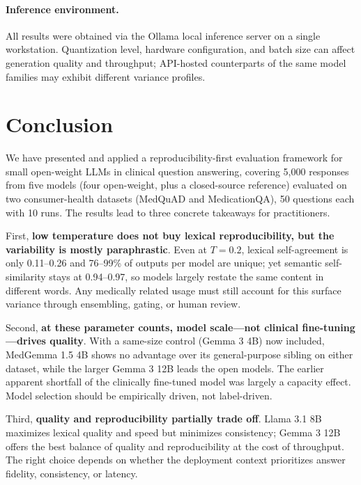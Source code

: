 \documentclass[10pt,letterpaper]{article}
\begin{document}
\paragraph{Inference environment.}
All results were obtained via the Ollama local inference server on a
single workstation.
Quantization level, hardware configuration, and batch size can affect
generation quality and throughput; API-hosted counterparts of the same
model families may exhibit different variance profiles.

\section*{Conclusion}

We have presented and applied a reproducibility-first evaluation
framework for small open-weight LLMs in clinical question answering,
covering 5,000 responses from five models (four open-weight, plus a
closed-source reference) evaluated on two consumer-health datasets
(MedQuAD and MedicationQA), 50 questions each with 10 runs.
The results lead to three concrete takeaways for practitioners.

First, \textbf{low temperature does not buy lexical reproducibility, but
the variability is mostly paraphrastic}.
Even at $T{=}0.2$, lexical self-agreement is only 0.11--0.26 and
76--99\% of outputs per model are unique; yet semantic self-similarity
stays at 0.94--0.97, so models largely restate the same content in
different words. Any medically related usage must still account for this
surface variance through ensembling, gating, or human review.

Second, \textbf{at these parameter counts, model scale---not clinical
fine-tuning---drives quality}.
With a same-size control (Gemma 3 4B) now included, MedGemma 1.5 4B
shows no advantage over its general-purpose sibling on either dataset,
while the larger Gemma 3 12B leads the open models. The earlier apparent
shortfall of the clinically fine-tuned model was largely a capacity
effect. Model selection should be empirically driven, not label-driven.

Third, \textbf{quality and reproducibility partially trade off}.
Llama 3.1 8B maximizes lexical quality and speed but minimizes
consistency; Gemma 3 12B offers the best balance of quality and
reproducibility at the cost of throughput.
The right choice depends on whether the deployment context prioritizes
answer fidelity, consistency, or latency.
\end{document}
